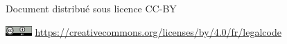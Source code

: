 \hspace{-1cm}\textcolor{inrae}{\sffamily \insertdate}\par

\vspace*{1cm}

\hspace{-1cm}\textcolor{inraefonce}{\sffamily \insertauthor}\par

\hspace{-1cm}\textcolor{inraefonce}{\sffamily
Document distribué sous licence CC-BY}\par

\hspace{-1cm}\includegraphics[width=1cm]{_extensions/quarto-inrae/ressources/cc-by} \href{https://creativecommons.org/licenses/by/4.0/fr/legalcode}{https://creativecommons.org/licenses/by/4.0/fr/legalcode}

\restoregeometry

